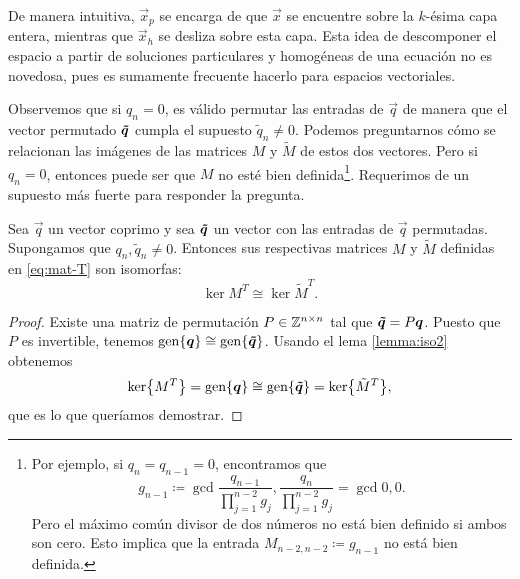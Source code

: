 De manera intuitiva, $\vec{x}_p$ se encarga de que $\vec{x}$ se encuentre sobre la $k$-ésima capa
entera, mientras que $\vec{x}_h$ se desliza sobre esta capa. Esta idea de descomponer el
espacio a partir de soluciones particulares y homogéneas de una ecuación no es novedosa,
pues es sumamente frecuente hacerlo para espacios vectoriales.

Observemos que si $q_n = 0$, es válido permutar las entradas de $\vec{q}$ de manera que el vector
permutado $\boldsymbol{\tilde{q}}$ cumpla el supuesto $\tilde{q}_n \neq 0$. Podemos preguntarnos cómo se
relacionan las imágenes de las matrices $M$ y $\tilde{M}$ de estos dos vectores. Pero si
$q_n = 0$, entonces puede ser que $M$ no esté bien definida\footnote{
	Por ejemplo, si $q_n = q_{n-1} = 0$, encontramos que
	\begin{equation*}
		g_{n-1} \coloneq \gcd{\frac{q_{n-1}}{\prod_{j=1}^{n-2}g_j},
		\frac{q_n}{\prod_{j=1}^{n-2}g_j}} = \gcd{0, 0}.
	\end{equation*}
	Pero el máximo común divisor de dos números no está bien definido si ambos son cero. Esto
	implica que la entrada $M_{n-2, n-2} \coloneq g_{n-1}$ no está bien definida.
}. Requerimos de un supuesto más fuerte para responder la pregunta.
\begin{corollary}
	\label{cor:iso3}
	Sea $\vec{q}$ un vector coprimo y sea $\boldsymbol{\tilde{q}}$ un vector con las entradas de $\vec{q}$
	permutadas. Supongamos que $q_n, \tilde{q}_n \neq 0$. Entonces sus respectivas matrices $M$ y
	$\tilde{M}$ definidas en \eqref{eq:mat-T} son isomorfas:
	\begin{equation*}
		\ker{M^T} \cong \ker{\tilde{M}^T}.
	\end{equation*}
\end{corollary}
\begin{proof}
	Existe una matriz de permutación $P \in \mathbb{Z}^{n \times n}$ tal que $\boldsymbol{\tilde{q}} = P\boldsymbol{q}$.
	Puesto que $P$ es invertible, tenemos $\operatorname{gen}\lbrace \boldsymbol{q} \rbrace \cong
	\operatorname{gen}\lbrace \boldsymbol{\tilde{q}} \rbrace$. Usando el lema \ref{lemma:iso2} obtenemos
	\begin{equation*}
		\mathop{\mathrm{ker}{\left\lbrace M^T \right\rbrace}} = \operatorname{gen}\lbrace \boldsymbol{q} \rbrace \cong \operatorname{gen}\lbrace \boldsymbol{\tilde{q}} \rbrace = \mathop{\mathrm{ker}{\left\lbrace \tilde{M}^T \right\rbrace}},
	\end{equation*}
	que es lo que queríamos demostrar.
\end{proof}

